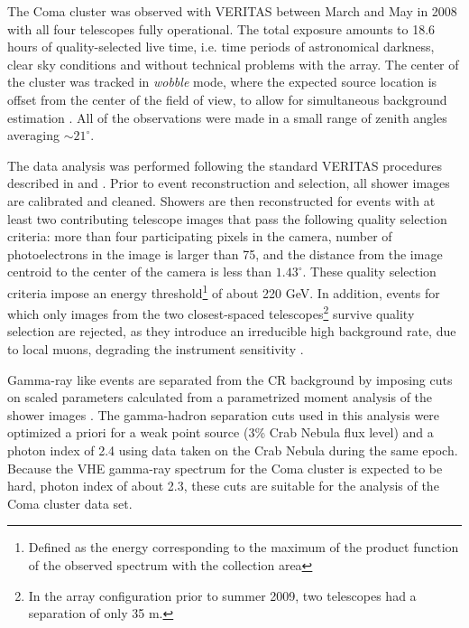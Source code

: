 \documentclass[12pt,manuscript]{aastex}
\begin{document}
The Coma cluster was observed with VERITAS between March and May in 2008 with all four telescopes
fully operational. The total exposure amounts to 18.6 hours of quality-selected live time, i.e.
time periods of astronomical darkness, clear sky conditions and without technical problems with the
array. The center of the cluster was tracked in \emph{wobble} mode, where the expected source
location is offset from the center of the field of view, to allow for simultaneous background
estimation \citep{article:Formin_etal:1994}. All of the observations were made in a small range of
zenith angles averaging $\sim 21^{\circ}$.

The data analysis was performed following the standard VERITAS procedures described in
\citet{inproc:Cogan_etal:2007} and \citet{inproc:Daniel_etal:2007}. Prior to event reconstruction
and selection, all shower images are calibrated and cleaned. Showers are then reconstructed for
events with at least two contributing telescope images that pass the following quality selection
criteria: more than four participating pixels in the camera, number of photoelectrons in the image
is larger than 75, and the distance from the image centroid to the center of the camera is less
than $1.43^{\circ}$. These quality selection criteria impose an energy threshold\footnote{Defined
as the energy corresponding to the maximum of the product function of the observed spectrum with
the collection area} of about 220 GeV. In addition, events for which only images from the two
closest-spaced telescopes\footnote{In the array configuration prior to summer 2009, two telescopes 
had a separation of only 35 m.} survive quality selection are rejected, as they introduce an
irreducible high background rate, due to local muons, degrading the instrument sensitivity
\citep{article:MaierKnapp:2007}.

Gamma-ray like events are separated from the CR background by imposing cuts on scaled parameters
\citep{article:Aharonian_etal:1997, article:Krawczynski_etal:2006} calculated from a parametrized
moment analysis of the shower images \citep{inproc:Hillas:1985}. The gamma-hadron separation cuts
used in this analysis were optimized a priori for a weak point source (3\% Crab Nebula flux level)
and a photon index of 2.4 using data taken on the Crab Nebula during the same epoch. Because the
VHE gamma-ray spectrum for the Coma cluster is expected to be hard, photon index of about 2.3,
these cuts are suitable for the analysis of the Coma cluster data set. 
\end{document}

